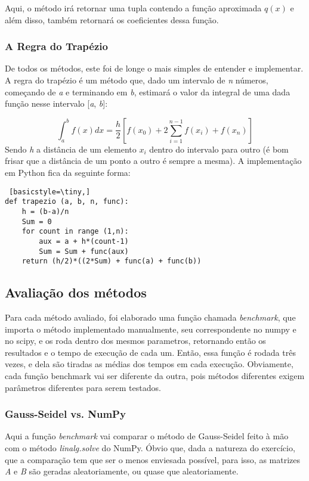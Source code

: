 \documentclass[12pt,A4]{report}
\begin{document}
Aqui, o método irá retornar uma tupla contendo a função aproximada $q(x)$ e além disso, também retornará os coeficientes dessa função.

\subsubsection{A Regra do Trapézio}
De todos os métodos, este foi de longe o mais simples de entender e implementar. A regra do trapézio é um método que, dado um intervalo de \textit{n} números, começando de \textit{a} e terminando em \textit{b}, estimará o valor da integral de uma dada função nesse intervalo [\textit{a}, \textit{b}]:

\begin{equation}
    \int_{a}^{b} f(x)dx = \frac{h}{2}[f(x_0) + 2\sum_{i=1}^{n-1} f(x_i) + f(x_n)]
\end{equation}
Sendo \textit{h} a distância de um elemento $x_i$ dentro do intervalo para outro (é bom frisar que a distância de um ponto a outro é sempre a mesma). A implementação em Python fica da seguinte forma:

\begin{lstlisting} [basicstyle=\tiny,]
def trapezio (a, b, n, func):
    h = (b-a)/n
    Sum = 0
    for count in range (1,n):
        aux = a + h*(count-1)
        Sum = Sum + func(aux)
    return (h/2)*((2*Sum) + func(a) + func(b))
\end{lstlisting}
\subsection{Avaliação dos métodos}
Para cada método avaliado, foi elaborado uma função chamada \textit{benchmark}, que importa o método implementado manualmente, seu correspondente no numpy e no scipy, e os roda dentro dos mesmos parametros, retornando então os resultados e o tempo de execução de cada um. Então, essa função é rodada três vezes, e dela são tiradas as médias dos tempos em cada execução. Obviamente, cada função benchmark vai ser diferente da outra, pois métodos diferentes exigem parâmetros diferentes para serem testados.

\subsubsection{Gauss-Seidel vs. NumPy}
Aqui a função \textit{benchmark} vai comparar o método de Gauss-Seidel feito à mão com o método \textit{linalg.solve} do NumPy. Óbvio que, dada a natureza do exercício, que a comparação tem que ser o menos enviesada possível, para isso, as matrizes \textit{A} e \textit{B} são geradas aleatoriamente, ou quase que aleatoriamente.
\end{document}
